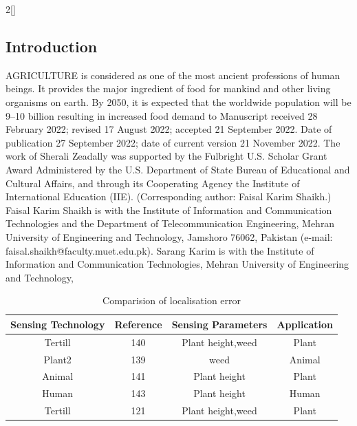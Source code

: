 \documentclass[10pt]{article}
\begin{document}
\begin{multicols}{2}[]
\begin{center}
    \section{Introduction}
\end{center}
{
AGRICULTURE is considered as one of the most ancient
professions of human beings. It provides the major ingredient of food for mankind and other living organisms on
earth. By 2050, it is expected that the worldwide population
will be 9–10 billion resulting in increased food demand to
Manuscript received 28 February 2022; revised 17 August 2022; accepted
21 September 2022. Date of publication 27 September 2022; date of
current version 21 November 2022. The work of Sherali Zeadally was supported by the Fulbright U.S. Scholar Grant Award Administered by the
U.S. Department of State Bureau of Educational and Cultural Affairs, and
through its Cooperating Agency the Institute of International Education (IIE).
(Corresponding author: Faisal Karim Shaikh.)
Faisal Karim Shaikh is with the Institute of Information and Communication
Technologies and the Department of Telecommunication Engineering, Mehran
University of Engineering and Technology, Jamshoro 76062, Pakistan (e-mail:
faisal.shaikh@faculty.muet.edu.pk).
Sarang Karim is with the Institute of Information and Communication
Technologies, Mehran University of Engineering and Technology,
\begin{table}
    \centering
    \caption{Comparision of localisation error}
    \vspace{1mm}
    \begin{tabular}[h!]{c c c c}
        \hline
        
        \textbf{Sensing Technology} & \textbf{Reference} & \textbf{Sensing Parameters} & \textbf{Application} \\
        \hline
        Tertill & 140 & Plant height,weed & Plant\\ 
        \hline
        Plant2 & 139 & weed & Animal \\ 
        \hline
         Animal & 141 & Plant height & Plant \\ 
        \hline
        Human & 143 & Plant height & Human\\ 
        \hline
         Tertill & 121 & Plant height,weed & Plant  \\ 
        \hline
    \end{tabular}
    

\end{table}}
\end{multicols}
\end{document}
